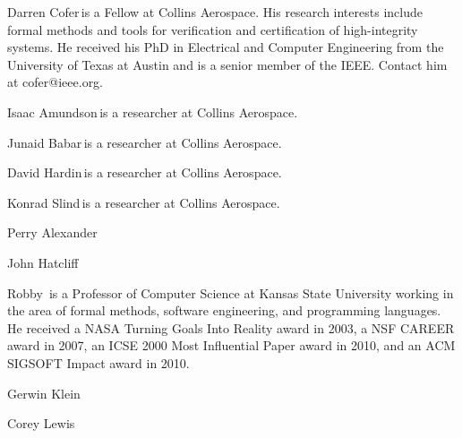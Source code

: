 \begin{IEEEbiography}{Darren Cofer}{\,}is a Fellow at Collins Aerospace. His research interests include formal methods and tools for verification and certification of high-integrity systems. He received his PhD in Electrical and Computer Engineering from the University of Texas at Austin and is a senior member of the IEEE. Contact him at cofer@ieee.org.
\end{IEEEbiography}

\begin{IEEEbiography}{Isaac Amundson}{\,}is a researcher at Collins Aerospace.  
\end{IEEEbiography}

\begin{IEEEbiography}{Junaid Babar}{\,}is a researcher at Collins Aerospace.  
\end{IEEEbiography}

\begin{IEEEbiography}{David Hardin}{\,}is a researcher at Collins Aerospace.  
\end{IEEEbiography}

\begin{IEEEbiography}{Konrad Slind}{\,}is a researcher at Collins Aerospace.  
\end{IEEEbiography}

\begin{IEEEbiography}{Perry Alexander}{\,}  
\end{IEEEbiography}

\begin{IEEEbiography}{John Hatcliff}{\,}  
\end{IEEEbiography}

\begin{IEEEbiography}{Robby}{\,}
is a Professor of Computer Science at Kansas State University working
in the area of formal methods, software engineering, and programming languages.
He received a NASA Turning Goals Into Reality award in 2003,
a NSF CAREER award in 2007, an ICSE 2000 Most Influential Paper award in 2010,
and an ACM SIGSOFT Impact award in 2010.
\end{IEEEbiography}

\begin{IEEEbiography}{Gerwin Klein}{\,}  
\end{IEEEbiography}

\begin{IEEEbiography}{Corey Lewis}{\,}  
\end{IEEEbiography}

